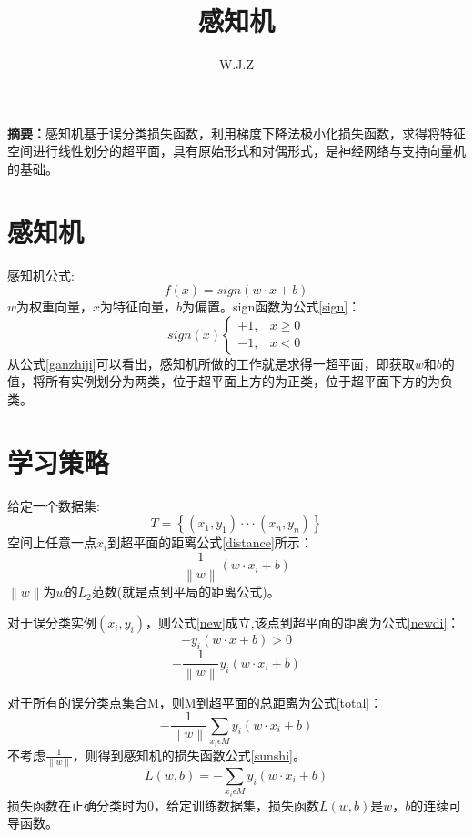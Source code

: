 \documentclass[twocolumn]{article}
\title{感知机}
\author{W.J.Z}
\date{}
\begin{document}
	\maketitle
	\textbf{摘要：}感知机基于误分类损失函数，利用梯度下降法极小化损失函数，求得将特征空间进行线性划分的超平面，具有原始形式和对偶形式，是神经网络与支持向量机的基础。
	
	\section{感知机}
	感知机公式:
	\begin{equation}
	f(x)=sign(w\cdot x + b)
	\label{ganzhiji}
	\end{equation}
	$w$为权重向量，$x$为特征向量，$b$为偏置。sign函数为公式\ref{sign}：
	\begin{equation}
	sign(x)\left\{\begin{matrix}
	+1, & x \geq 0 \\ 
	-1,& x < 0
	\end{matrix}\right.
	\label{sign}
	\end{equation}
	从公式\ref{ganzhiji}可以看出，感知机所做的工作就是求得一超平面，即获取$w$和$b$的值，将所有实例划分为两类，位于超平面上方的为正类，位于超平面下方的为负类。
	
	\section{学习策略}
	给定一个数据集:
	$$T=\left \{ \left ( x_{1},y_{1} \right )\cdot \cdot \cdot \left ( x_{n},y_{n} \right ) \right \}$$
	空间上任意一点$x_{i}$到超平面的距离公式\ref{distance}所示：
	\begin{equation}
	\frac{1}{\left \| w \right \|}\left ( w\cdot x_{i}+b \right )
	\label{distance}
	\end{equation}
	$\left \| w \right \|$为$w$的$L_{2}$范数(就是点到平局的距离公式)。
	
	对于误分类实例$\left ( x_{i},y_{i} \right )$，则公式\ref{new}成立,该点到超平面的距离为公式\ref{newdi}：
	\begin{equation}
	-y_{i}\left ( w\cdot x+b \right )> 0 
	\label{new}
	\end{equation}
	\begin{equation}
		-\frac{1}{\left \| w \right \|}y_{i}\left ( w\cdot x_{i}+b \right )
		\label{newdi}
	\end{equation}
	
	对于所有的误分类点集合M，则M到超平面的总距离为公式\ref{total}：
	\begin{equation}
	-\frac{1}{\left \| w \right \|}\sum_{x_{i}\epsilon M}y_{i}(w\cdot x_{i}+b)
	\label{total}
	\end{equation}
	不考虑$\frac{1}{\left \| w \right \|}$，则得到感知机的损失函数公式\ref{sunshi}。
	\begin{equation}
	L(w,b)=-\sum_{x_{i}\epsilon M}y_{i}(w\cdot x_{i}+b)
	\label{sunshi}
	\end{equation}
	损失函数在正确分类时为0，给定训练数据集，损失函数$L(w,b)$是$w，b$的连续可导函数。
	
\end{document}
